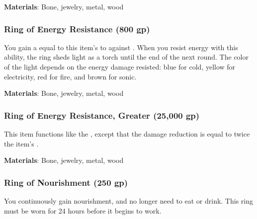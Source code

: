 \vspace{0.25em}
\textbf{Materials}: Bone, jewelry, metal, wood


\lowercase{\hypertarget{item:Ring of Energy Resistance}{}}\label{item:Ring of Energy Resistance}
\hypertarget{item:Ring of Energy Resistance}{\subsubsection{Ring of Energy Resistance\hfill{} (800 gp)}}

You gain a  equal to this item's  to  against .
When you resist energy with this ability, the ring sheds light as a torch until the end of the next round.
The color of the light depends on the energy damage resisted: blue for cold, yellow for electricity, red for fire, and brown for sonic.



\vspace{0.25em}
\textbf{Materials}: Bone, jewelry, metal, wood


\lowercase{\hypertarget{item:Ring of Energy Resistance, Greater}{}}\label{item:Ring of Energy Resistance, Greater}
\hypertarget{item:Ring of Energy Resistance, Greater}{\subsubsection{Ring of Energy Resistance, Greater\hfill{} (25,000 gp)}}

This item functions like the , except that the damage reduction is equal to twice the item's .



\vspace{0.25em}
\textbf{Materials}: Bone, jewelry, metal, wood


\lowercase{\hypertarget{item:Ring of Nourishment}{}}\label{item:Ring of Nourishment}
\hypertarget{item:Ring of Nourishment}{\subsubsection{Ring of Nourishment\hfill{} (250 gp)}}

You continuously gain nourishment, and no longer need to eat or drink.
This ring must be worn for 24 hours before it begins to work.



